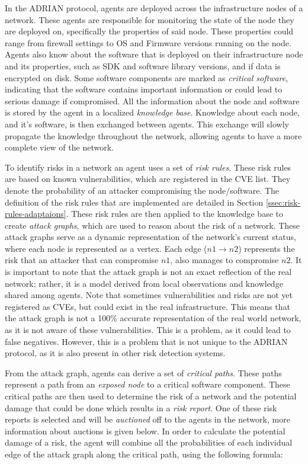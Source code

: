 In the ADRIAN protocol, agents are deployed across the infrastructure nodes of a network. These agents are responsible for monitoring the state of the node they are deployed on, specifically the properties of said node. These properties could range from firewall settings to OS and Firmware versions running on the node. Agents also know about the software that is deployed on their infrastructure node and its properties, such as SDK and software library versions, and if data is encrypted on disk. Some software components are marked as \emph{critical software}, indicating that the software contains important information or could lead to serious damage if compromised. All the information about the node and software is stored by the agent in a localized \emph{knowledge base}. Knowledge about each node, and it's software, is then exchanged between agents. This exchange will slowly propagate the knowledge throughout the network, allowing agents to have a more complete view of the network.

\vspace{0.5em}
To identify risks in a network an agent uses a set of \emph{risk rules}. These risk rules are based on known vulnerabilities, which are registered in the CVE list. They denote the probability of an attacker compromising the node/software. The definition of the risk rules that are implemented are detailed in Section \ref{ssec:risk-rules-adaptaions}.
These risk rules are then applied to the knowledge base to create \emph{attack graphs}, which are used to reason about the risk of a network. These attack graphs serve as a dynamic representation of the network's current status, where each node is represented as a vertex. Each edge ($n1 \rightarrow n2$) represents the risk that an attacker that can compromise $n1$, also manages to compromise $n2$. It is important to note that the attack graph is not an exact reflection of the real network; rather, it is a model derived from local observations and knowledge shared among agents. 
Note that sometimes vulnerabilities and risks are not yet registered as CVEs, but could exist in the real infrastructure. This means that the attack graph is not a 100\% accurate representation of the real world network, as it is not aware of these vulnerabilities. This is a problem, as it could lead to false negatives. However, this is a problem that is not unique to the ADRIAN protocol, as it is also present in other risk detection systems.

From the attack graph, agents can derive a set of \emph{critical paths}. These paths represent a path from an \emph{exposed node} to a critical software component. These critical paths are then used to determine the risk of a network and the potential damage that could be done which results in a \emph{risk report}. One of these risk reports is selected and will be \emph{auctioned} off to the agents in the network, more information about auctions is given below. In order to calculate the potential damage of a risk, the agent will combine all the probabilities of each individual edge of the attack graph along the critical path, using the following formula:

